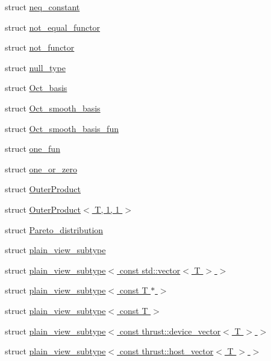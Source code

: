 \begin{DoxyCompactItemize}
struct \hyperlink{structcugar_1_1neq__constant}{neq\+\_\+constant}
\item 
struct \hyperlink{structcugar_1_1not__equal__functor}{not\+\_\+equal\+\_\+functor}
\item 
struct \hyperlink{structcugar_1_1not__functor}{not\+\_\+functor}
\item 
struct \hyperlink{structcugar_1_1null__type}{null\+\_\+type}
\item 
struct \hyperlink{structcugar_1_1_oct__basis}{Oct\+\_\+basis}
\item 
struct \hyperlink{structcugar_1_1_oct__smooth__basis}{Oct\+\_\+smooth\+\_\+basis}
\item 
struct \hyperlink{structcugar_1_1_oct__smooth__basis__fun}{Oct\+\_\+smooth\+\_\+basis\+\_\+fun}
\item 
struct \hyperlink{structcugar_1_1one__fun}{one\+\_\+fun}
\item 
struct \hyperlink{structcugar_1_1one__or__zero}{one\+\_\+or\+\_\+zero}
\item 
struct \hyperlink{structcugar_1_1_outer_product}{Outer\+Product}
\item 
struct \hyperlink{structcugar_1_1_outer_product_3_01_t_00_011_00_011_01_4}{Outer\+Product$<$ T, 1, 1 $>$}
\item 
struct \hyperlink{structcugar_1_1_pareto__distribution}{Pareto\+\_\+distribution}
\item 
struct \hyperlink{structcugar_1_1plain__view__subtype}{plain\+\_\+view\+\_\+subtype}
\item 
struct \hyperlink{structcugar_1_1plain__view__subtype_3_01const_01std_1_1vector_3_01_t_01_4_01_4}{plain\+\_\+view\+\_\+subtype$<$ const std\+::vector$<$ T $>$ $>$}
\item 
struct \hyperlink{structcugar_1_1plain__view__subtype_3_01const_01_t_01_5_01_4}{plain\+\_\+view\+\_\+subtype$<$ const T $\ast$ $>$}
\item 
struct \hyperlink{structcugar_1_1plain__view__subtype_3_01const_01_t_01_4}{plain\+\_\+view\+\_\+subtype$<$ const T $>$}
\item 
struct \hyperlink{structcugar_1_1plain__view__subtype_3_01const_01thrust_1_1device__vector_3_01_t_01_4_01_4}{plain\+\_\+view\+\_\+subtype$<$ const thrust\+::device\+\_\+vector$<$ T $>$ $>$}
\item 
struct \hyperlink{structcugar_1_1plain__view__subtype_3_01const_01thrust_1_1host__vector_3_01_t_01_4_01_4}{plain\+\_\+view\+\_\+subtype$<$ const thrust\+::host\+\_\+vector$<$ T $>$ $>$}
\item 

\end{DoxyCompactItemize}
